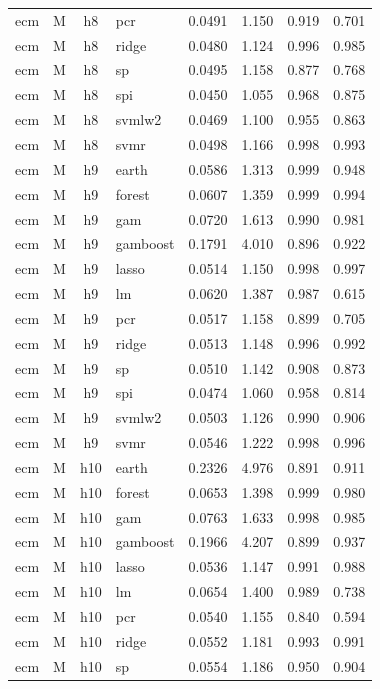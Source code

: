 \begin{ThreePartTable}
\begin{longtable}[t]{llclcccc}
ecm & M & h8 & pcr & 0.0491 & 1.150 & 0.919 & 0.701\\
ecm & M & h8 & ridge & 0.0480 & 1.124 & 0.996 & 0.985\\
ecm & M & h8 & sp & 0.0495 & 1.158 & 0.877 & 0.768\\
ecm & M & h8 & spi & 0.0450 & 1.055 & 0.968 & 0.875\\
ecm & M & h8 & svmlw2 & 0.0469 & 1.100 & 0.955 & 0.863\\
ecm & M & h8 & svmr & 0.0498 & 1.166 & 0.998 & 0.993\\
\addlinespace
ecm & M & h9 & earth & 0.0586 & 1.313 & 0.999 & 0.948\\
ecm & M & h9 & forest & 0.0607 & 1.359 & 0.999 & 0.994\\
ecm & M & h9 & gam & 0.0720 & 1.613 & 0.990 & 0.981\\
ecm & M & h9 & gamboost & 0.1791 & 4.010 & 0.896 & 0.922\\
ecm & M & h9 & lasso & 0.0514 & 1.150 & 0.998 & 0.997\\
ecm & M & h9 & lm & 0.0620 & 1.387 & 0.987 & 0.615\\
ecm & M & h9 & pcr & 0.0517 & 1.158 & 0.899 & 0.705\\
ecm & M & h9 & ridge & 0.0513 & 1.148 & 0.996 & 0.992\\
ecm & M & h9 & sp & 0.0510 & 1.142 & 0.908 & 0.873\\
ecm & M & h9 & spi & 0.0474 & 1.060 & 0.958 & 0.814\\
ecm & M & h9 & svmlw2 & 0.0503 & 1.126 & 0.990 & 0.906\\
ecm & M & h9 & svmr & 0.0546 & 1.222 & 0.998 & 0.996\\
\addlinespace
ecm & M & h10 & earth & 0.2326 & 4.976 & 0.891 & 0.911\\
ecm & M & h10 & forest & 0.0653 & 1.398 & 0.999 & 0.980\\
ecm & M & h10 & gam & 0.0763 & 1.633 & 0.998 & 0.985\\
ecm & M & h10 & gamboost & 0.1966 & 4.207 & 0.899 & 0.937\\
ecm & M & h10 & lasso & 0.0536 & 1.147 & 0.991 & 0.988\\
ecm & M & h10 & lm & 0.0654 & 1.400 & 0.989 & 0.738\\
ecm & M & h10 & pcr & 0.0540 & 1.155 & 0.840 & 0.594\\
ecm & M & h10 & ridge & 0.0552 & 1.181 & 0.993 & 0.991\\
ecm & M & h10 & sp & 0.0554 & 1.186 & 0.950 & 0.904\\

\end{longtable}
\end{ThreePartTable}
